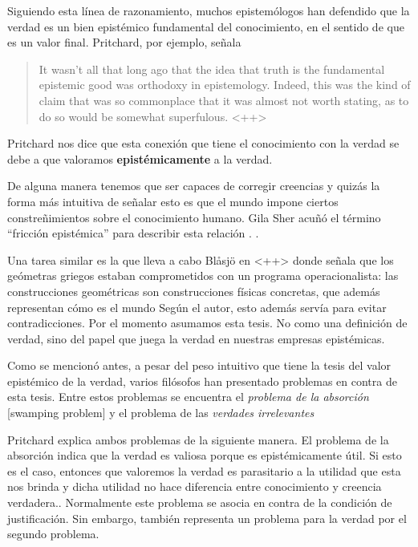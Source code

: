 \documentclass{article}
\begin{document}
Siguiendo esta línea de razonamiento, muchos epistemólogos han defendido que la verdad es un bien epistémico fundamental del conocimiento, en el sentido de que es un valor final. Pritchard, por ejemplo, señala

\begin{quote}
It wasn’t all that long ago that the idea that truth is the fundamental epistemic good was orthodoxy in epistemology. Indeed, this was the kind of claim that was so commonplace that it was almost not worth stating, as to do so would be somewhat superfulous. \citeyear[p. 1]{Pritchard2021}<++>
\end{quote}

Pritchard nos dice que esta conexión que tiene el conocimiento con la verdad se debe a que valoramos \textbf{epistémicamente} a la verdad. 

De alguna manera tenemos que ser capaces de corregir creencias y quizás la forma más intuitiva de señalar esto es que el mundo impone ciertos constreñimientos sobre el conocimiento humano. Gila Sher acuñó el término ``fricción epistémica'' para describir esta relación \citeyear{Sher2016}. . 

Una tarea similar es la que lleva a cabo Blåsjö en \citeyear{Blaasjoe2022}<++> donde señala que los geómetras griegos estaban comprometidos con un programa operacionalista: las construcciones geométricas son construcciones físicas concretas, que además representan cómo es el mundo Según el autor, esto además servía para evitar contradicciones. Por el momento asumamos esta tesis. No como una definición de verdad, sino del papel que juega la verdad en nuestras empresas epistémicas.

Como se mencionó antes, a pesar del peso intuitivo que tiene la tesis del valor epistémico de la verdad, varios filósofos han presentado problemas en contra de esta tesis. Entre estos problemas se encuentra el \textit{problema de la absorción} [swamping problem] y el problema de las \textit{verdades irrelevantes}

Pritchard explica ambos problemas de la siguiente manera. El problema de la absorción indica que la verdad es valiosa porque es epistémicamente útil. Si esto es el caso, entonces que valoremos la verdad es parasitario a la utilidad que esta nos brinda y dicha utilidad no hace diferencia entre conocimiento y creencia verdadera.. Normalmente este problema se asocia en contra de la condición de justificación. Sin embargo, también representa un problema para la verdad por el segundo problema.
\end{document}
